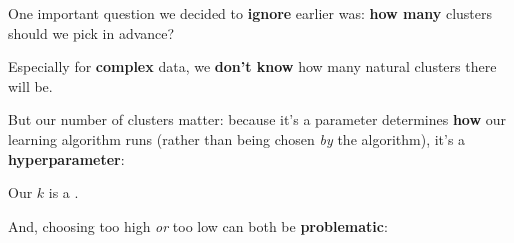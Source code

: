         One important question we decided to \textbf{ignore} earlier was: \textbf{how many} clusters should we pick in advance?
        
        Especially for \textbf{complex} data, we \textbf{don't know} how many natural clusters there will be. 
        
        But our number of clusters matter: because it's a parameter determines \textbf{how} our learning algorithm runs (rather than being chosen \textit{by} the algorithm), it's a \textbf{hyperparameter}:\\
        
        \begin{concept}
            Our  $k$ is a .
        \end{concept}
        
        And, choosing too high \textit{or} too low can both be \textbf{problematic}:
        
